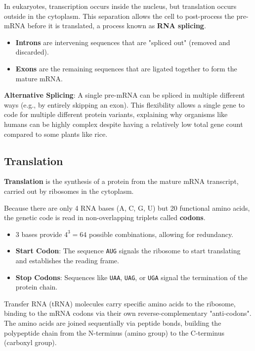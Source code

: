 \documentclass[11pt,a4paper]{article}
\begin{document}
In eukaryotes, transcription occurs inside the nucleus, but translation occurs outside in the cytoplasm. This separation allows the cell to post-process the pre-mRNA before it is translated, a process known as \textbf{RNA splicing}.
\begin{itemize}
    \item \textbf{Introns} are intervening sequences that are "spliced out" (removed and discarded).
    \item \textbf{Exons} are the remaining sequences that are ligated together to form the mature mRNA.
\end{itemize}

\textbf{Alternative Splicing}: A single pre-mRNA can be spliced in multiple different ways (e.g., by entirely skipping an exon). This flexibility allows a single gene to code for multiple different protein variants, explaining why organisms like humans can be highly complex despite having a relatively low total gene count compared to some plants like rice.


\subsection{Translation}
\textbf{Translation} is the synthesis of a protein from the mature mRNA transcript, carried out by ribosomes in the cytoplasm. 

Because there are only 4 RNA bases (A, C, G, U) but 20 functional amino acids, the genetic code is read in non-overlapping triplets called \textbf{codons}. 
\begin{itemize}
    \item 3 bases provide \(4^3 = 64\) possible combinations, allowing for redundancy.
    \item \textbf{Start Codon}: The sequence \texttt{AUG} signals the ribosome to start translating and establishes the reading frame.
    \item \textbf{Stop Codons}: Sequences like \texttt{UAA}, \texttt{UAG}, or \texttt{UGA} signal the termination of the protein chain.
\end{itemize}
Transfer RNA (tRNA) molecules carry specific amino acids to the ribosome, binding to the mRNA codons via their own reverse-complementary "anti-codons". The amino acids are joined sequentially via peptide bonds, building the polypeptide chain from the N-terminus (amino group) to the C-terminus (carboxyl group).
\end{document}
